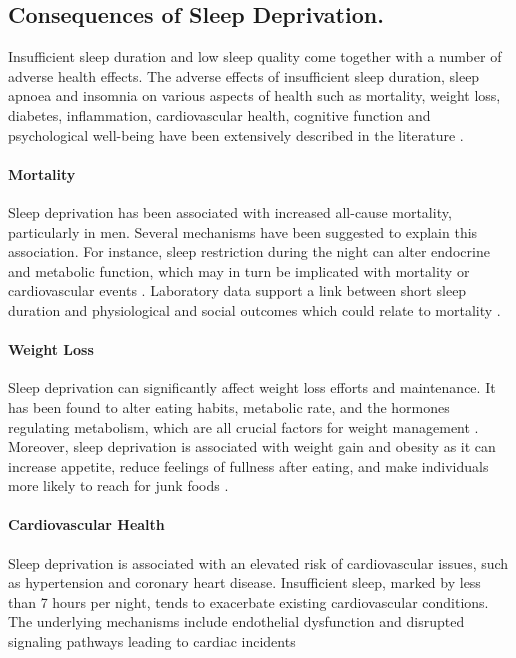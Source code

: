 \documentclass[
  a4paper,  %
  twoside,  %
  bibliography=totoc,
  headsepline,
  cleardoublepage=empty,
  parskip=half,
  draft=false
]{scrbook}
\begin{document}
\subsection{Consequences of Sleep Deprivation.}
Insufficient sleep duration and low sleep quality come together with a number of adverse health effects. The adverse effects of insufficient sleep duration, sleep apnoea and insomnia on various aspects of health such as mortality, weight loss, diabetes, inflammation, cardiovascular health, cognitive function and psychological well-being have been extensively described in the literature \cite{Sleep_Health_Society}.

\paragraph{Mortality}
Sleep deprivation has been associated with increased all-cause mortality, particularly in men. Several mechanisms have been suggested to explain this association. For instance, sleep restriction during the night can alter endocrine and metabolic function, which may in turn be implicated with mortality or cardiovascular events \cite{yin_relationship_2017}. Laboratory data support a link between short sleep duration and physiological and social outcomes which could relate to mortality \cite{grandner_mortality_2010}.

\paragraph{Weight Loss}
Sleep deprivation can significantly affect weight loss efforts and maintenance. It has been found to alter eating habits, metabolic rate, and the hormones regulating metabolism, which are all crucial factors for weight management \cite{papatriantafyllou_sleep_2022}. Moreover, sleep deprivation is associated with weight gain and obesity as it can increase appetite, reduce feelings of fullness after eating, and make individuals more likely to reach for junk foods \cite{chamorro_sleep_2011}.

\paragraph{Cardiovascular Health}
Sleep deprivation is associated with an elevated risk of cardiovascular issues, such as hypertension and coronary heart disease. Insufficient sleep, marked by less than 7 hours per night, tends to exacerbate existing cardiovascular conditions. The underlying mechanisms include endothelial dysfunction and disrupted signaling pathways leading to cardiac incidents \cite{belloir_sleep_2022}
\end{document}
